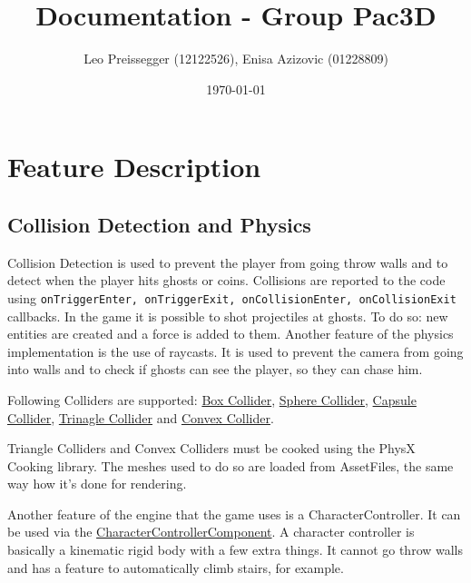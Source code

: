 \documentclass{article}
\title{Documentation - Group Pac3D}
\author{Leo Preissegger (12122526), Enisa Azizovic (01228809)}
\date{\today}
\begin{document}
    \maketitle

    \section{Feature Description}
    \label{sec:featureDesc}

    \subsection{Collision Detection and Physics}
    \label{sec:physics}

    Collision Detection is used to prevent the player from going throw walls and to detect when the player hits ghosts or coins. Collisions are reported to the code using \verb|onTriggerEnter, onTriggerExit, onCollisionEnter, onCollisionExit| callbacks. In the game it is possible to shot projectiles at ghosts. To do so: new entities are created and a force is added to them. Another feature of the physics implementation is the use of raycasts. It is used to prevent the camera from going into walls and to check if ghosts can see the player, so they can chase him.

    Following Colliders are supported: \href{https://github.com/Liioooo/cgue23-pac3D/blob/master/docs/md/COMPONENTS_DOCS.md#boxcollidercomponent}{Box Collider}, \href{https://github.com/Liioooo/cgue23-pac3D/blob/master/docs/md/COMPONENTS_DOCS.md#boxcollidercomponent}{Sphere Collider}, \href{https://github.com/Liioooo/cgue23-pac3D/blob/master/docs/md/COMPONENTS_DOCS.md#boxcollidercomponent}{Capsule Collider}, \href{https://github.com/Liioooo/cgue23-pac3D/blob/master/docs/md/COMPONENTS_DOCS.md#boxcollidercomponent}{Trinagle Collider} and \href{https://github.com/Liioooo/cgue23-pac3D/blob/master/docs/md/COMPONENTS_DOCS.md#boxcollidercomponent}{Convex Collider}.

    Triangle Colliders and Convex Colliders must be cooked using the PhysX Cooking library. The meshes used to do so are loaded from AssetFiles, the same way how it's done for rendering.

    Another feature of the engine that the game uses is a CharacterController. It can be used via the \href{https://github.com/Liioooo/cgue23-pac3D/blob/master/docs/md/COMPONENTS_DOCS.md#charactercontrollercomponent}{CharacterControllerComponent}. A character controller is basically a kinematic rigid body with a few extra things. It cannot go throw walls and has a feature to automatically climb stairs, for example.
\end{document}
